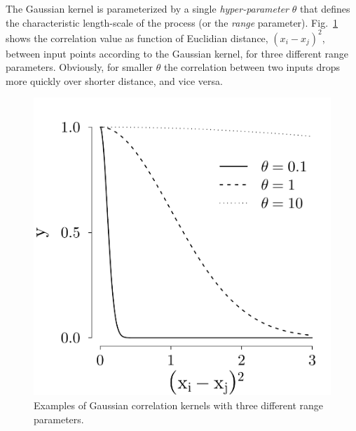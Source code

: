 The Gaussian kernel is parameterized by a single \emph{hyper-parameter} $\theta$ that defines the characteristic length-scale of the process (or the \emph{range} parameter).
Fig.~\ref{fig:plot_corrfun_gauss} shows the correlation value as function of Euclidian distance, $(x_i - x_j)^2$, between input points according to the Gaussian kernel, 
for three different range parameters.
Obviously, for smaller $\theta$ the correlation between two inputs drops more quickly over shorter distance, and vice versa.
\begin{figure}[bth]
	\centering
	\includegraphics[scale=0.35]{../figures/chapter4/figures/plotCorrFunGauss}
	\caption[Gaussian correlation kernels with three different range parameters.]{Examples of Gaussian correlation kernels with three different range parameters.}
	\label{fig:plot_corrfun_gauss}
\end{figure}

